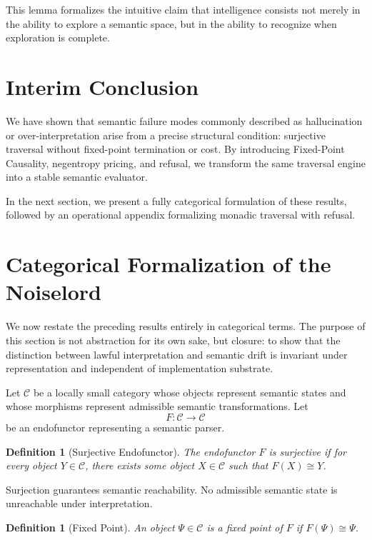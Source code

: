 \documentclass[12pt]{article}
\newtheorem{definition}[theorem]{Definition}
\theoremstyle{remark}
\begin{document}
This lemma formalizes the intuitive claim that intelligence consists not merely in the ability to explore a semantic space, but in the ability to recognize when exploration is complete.

\section{Interim Conclusion}

We have shown that semantic failure modes commonly described as hallucination or over-interpretation arise from a precise structural condition: surjective traversal without fixed-point termination or cost. By introducing Fixed-Point Causality, negentropy pricing, and refusal, we transform the same traversal engine into a stable semantic evaluator.

In the next section, we present a fully categorical formulation of these results, followed by an operational appendix formalizing monadic traversal with refusal.

\section{Categorical Formalization of the Noiselord}

We now restate the preceding results entirely in categorical terms. The purpose of this section is not abstraction for its own sake, but closure: to show that the distinction between lawful interpretation and semantic drift is invariant under representation and independent of implementation substrate.

Let $\mathcal{C}$ be a locally small category whose objects represent semantic states and whose morphisms represent admissible semantic transformations. Let
\[
F : \mathcal{C} \to \mathcal{C}
\]
be an endofunctor representing a semantic parser.

\begin{definition}[Surjective Endofunctor]
The endofunctor $F$ is surjective if for every object $Y \in \mathcal{C}$, there exists some object $X \in \mathcal{C}$ such that $F(X) \cong Y$.
\end{definition}

Surjection guarantees semantic reachability. No admissible semantic state is unreachable under interpretation.

\begin{definition}[Fixed Point]
An object $\Psi \in \mathcal{C}$ is a fixed point of $F$ if $F(\Psi) \cong \Psi$.
\end{definition}
\end{document}
